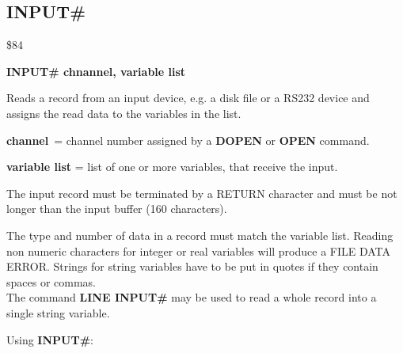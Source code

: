 
\newpage
\subsection{INPUT\#}
\begin{description}[leftmargin=3cm,style=nextline]
\item [Token:] \$84
\item [Format:] {\bf INPUT\# chnannel, variable list}
\item [Usage:] Reads a record
               from an input device, e.g. a disk file
               or a RS232 device and assigns the read data
               to the variables in the list.

               {\bf channel} = channel number assigned
               by a {\bf DOPEN} or {\bf OPEN} command.

               {\bf variable list} = list of one or more
               variables, that receive the input.

               The input record must be terminated by a
               RETURN character and must be not longer than
               the input buffer (160 characters).

\item [Remarks:] The type and number of data in a record must
               match the variable list.
               Reading non numeric characters for integer or real
               variables will produce a FILE DATA ERROR.
               Strings for string variables have to be put in quotes
               if they contain spaces or commas. \\
               The command {\bf LINE INPUT\#} may be used to
               read a whole record into a single string variable.

\item [Example:] Using {\bf INPUT\#}:
\end{description}


\newpage
